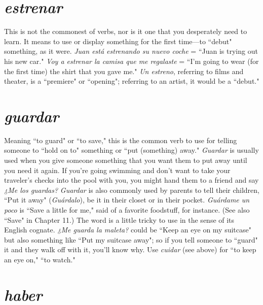 \section{\emph{estrenar}}

This is not the commonest of verbs, nor is it one that you desperately need to learn. It means to use or display something for the
first time---to ``debut" something, as it were. \emph{Juan está estrenando su
	nuevo coche} = ``Juan is trying out his new car." \emph{Voy a estrenar la camisa que me regalaste} = ``I'm going to wear (for the first time) the
shirt that you gave me." \emph{Un estreno}, referring to films and theater, is a
``premiere" or ``opening"; referring to an artist, it would be a ``debut."

\section{\emph{guardar}}

Meaning ``to guard" or ``to save," this is the common verb to
use for telling someone to ``hold on to" something or ``put (something)
away." \emph{Guardar} is usually used when you give someone something
that you want them to put away until you need it again. If you're going
swimming and don't want to take your traveler's checks into the pool
with you, you might hand them to a friend and say \emph{¿Me los guardas?}
\emph{Guardar} is also commonly used by parents to tell their children, ``Put
it away" (\emph{Guárdalo}), be it in their closet or in their pocket. \emph{Guárdame
	un poco} is ``Save a little for me," said of a favorite foodstuff, for instance. (See also ``Save" in Chapter 11.) The word is a little tricky to
use in the sense of its English cognate. \emph{¿Me guarda la maleta?} could be
``Keep an eye on my suitcase" but also something like ``Put my suitcase away"; so if you tell someone to ``guard" it and they walk off with
it, you'll know why. Use \emph{cuidar} (see above) for ``to keep an eye on,"
``to watch."

\section{\emph{haber}}

